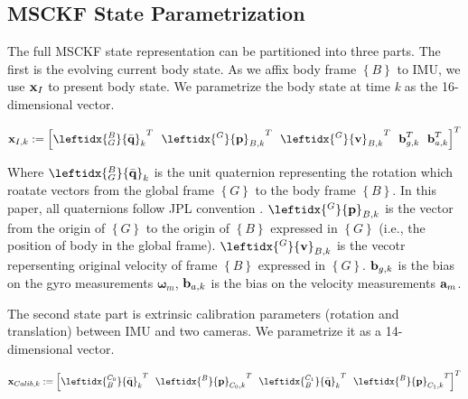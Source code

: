 \documentclass[a4paper, 10pt, conference]{ieeeconf}      %
\begin{document}
\subsection{MSCKF State Parametrization}
The full MSCKF state representation can be partitioned into three parts. The first is the evolving current body state. As we affix body frame $\left\lbrace B \right\rbrace$ to IMU, we use $ \textbf x_{I}  $ to present body state. We parametrize the body state at time \emph k as the 16-dimensional vector.

\begin {equation}
\textbf x_{I,k} :=\left[  {\leftidx{_G^B}{\bar{\textbf q}}_k}^{ T} \ \
{\leftidx{^G}{\textbf p}_{B,k}}^T \ \
{\leftidx{^G}{\textbf v}_{B,k}}^T \ \
\textbf b_{g,k}^T\ \
\textbf b_{a,k}^T 
\right]^T 
\end{equation}



Where $  {\leftidx{_G^B}{\bar{\textbf q}}_k}  $ is the unit quaternion representing the rotation which roatate vectors 
from the global frame  $\left\lbrace G \right\rbrace$ to the body frame  $\left\lbrace B \right\rbrace$. In this paper, all quaternions follow JPL convention \cite{sola2012quaternion}. $ {\leftidx{^G}{\textbf p}_{B,k}} $ is the vector from the
origin of $\left\lbrace G \right\rbrace$ to the origin of $\left\lbrace B \right\rbrace$ expressed in $\left\lbrace G \right\rbrace$ (i.e., the position of body in the global frame). $ {\leftidx{^G}{\textbf v}_{B,k}} $ is the vecotr repersenting original velocity of  frame  $\left\lbrace B \right\rbrace$ expressed in  $\left\lbrace G \right\rbrace$. $ \textbf b_{g,k} $ is the
bias on the gyro measurements $  \bm{ \omega}_m  $, $ \textbf  b_{a,k} $ is the bias on the
velocity measurements $ \textbf a_m $.

The second state part is extrinsic calibration parameters (rotation and translation) between IMU and two cameras. We parametrize it as a 14-dimensional vector.

\begin {equation}
\textbf x_{Calib,k} :=\left[  {\leftidx{_B^{C_0}}{\bar{\textbf q}}_k}^{ T} \ \
{\leftidx{^B}{\textbf p}_{C_0,k}}^T \ \
{\leftidx{_B^{C_1}}{\bar{\textbf q}}_k}^{ T} \ \
{\leftidx{^B}{\textbf p}_{C_1,k}}^T 
\right]^T
\end{equation}
\end{document}
